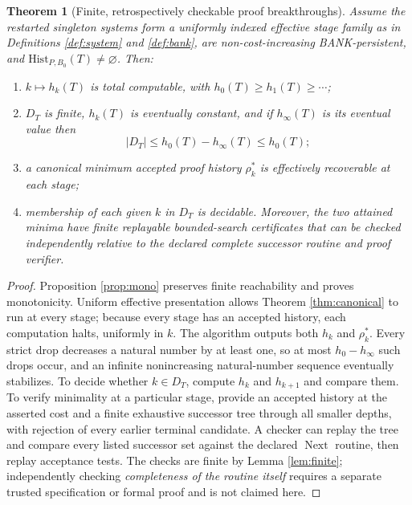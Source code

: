 \documentclass[11pt]{article}
\newtheorem{theorem}{Theorem}[section]
\theoremstyle{definition}
\newcommand{\Hist}{\mathrm{Hist}}
\begin{document}
\begin{theorem}[Finite, retrospectively checkable proof breakthroughs]\label{thm:ladder}
Assume the restarted singleton systems form a uniformly indexed effective stage family as in Definitions \ref{def:system} and \ref{def:bank}, are non-cost-increasing BANK-persistent, and $\Hist_{P,B_0}(T)\ne\varnothing$. Then:
\begin{enumerate}[label=(\roman*)]
\item $k\mapsto h_k(T)$ is total computable, with $h_0(T)\ge h_1(T)\ge\cdots$;
\item $D_T$ is finite, $h_k(T)$ is eventually constant, and if $h_\infty(T)$ is its eventual value then
\[
|D_T|\le h_0(T)-h_\infty(T)\le h_0(T);
\]
\item a canonical minimum accepted proof history $\rho_k^*$ is effectively recoverable at each stage;
\item membership of each given $k$ in $D_T$ is decidable. Moreover, the two attained minima have finite replayable bounded-search certificates that can be checked independently \emph{relative to the declared complete successor routine and proof verifier}.
\end{enumerate}
\end{theorem}
\begin{proof}
Proposition \ref{prop:mono} preserves finite reachability and proves monotonicity. Uniform effective presentation allows Theorem \ref{thm:canonical} to run at every stage; because every stage has an accepted history, each computation halts, uniformly in $k$. The algorithm outputs both $h_k$ and $\rho_k^*$. Every strict drop decreases a natural number by at least one, so at most $h_0-h_\infty$ such drops occur, and an infinite nonincreasing natural-number sequence eventually stabilizes. To decide whether $k\in D_T$, compute $h_k$ and $h_{k+1}$ and compare them. To verify minimality at a particular stage, provide an accepted history at the asserted cost and a finite exhaustive successor tree through all smaller depths, with rejection of every earlier terminal candidate. A checker can replay the tree and compare every listed successor set against the declared $\operatorname{Next}$ routine, then replay acceptance tests. The checks are finite by Lemma \ref{lem:finite}; independently checking \emph{completeness of the routine itself} requires a separate trusted specification or formal proof and is not claimed here.
\end{proof}
\end{document}
